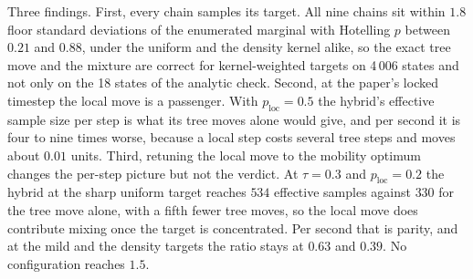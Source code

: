 \documentclass[11pt]{article}
\begin{document}
Three findings. First, every chain samples its target. All nine
chains sit within $1.8$ floor standard deviations of the enumerated
marginal with Hotelling $p$ between $0.21$ and $0.88$, under the
uniform and the density kernel alike, so the exact tree move and the
mixture are correct for kernel-weighted targets on 4\,006 states and
not only on the 18 states of the analytic check. Second, at the
paper's locked timestep the local move is a passenger. With
$p_{\mathrm{loc}} = 0.5$ the hybrid's effective sample size per step
is what its tree moves alone would give, and per second it is four to
nine times worse, because a local step costs several tree steps and
moves about $0.01$ units. Third, retuning the local move to the
mobility optimum changes the per-step picture but not the verdict. At
$\tau = 0.3$ and $p_{\mathrm{loc}} = 0.2$ the hybrid at the sharp
uniform target reaches $534$ effective samples against $330$ for the
tree move alone, with a fifth fewer tree moves, so the local move does
contribute mixing once the target is concentrated. Per second that is
parity, and at the mild and the density targets the ratio stays at
$0.63$ and $0.39$. No configuration reaches $1.5$.
\end{document}
